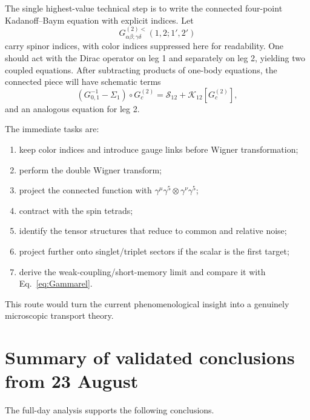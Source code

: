 \documentclass[11pt]{article}
\newcommand{\Scal}{\mathcal S}
\newcommand{\Kcal}{\mathcal K}
\begin{document}
The single highest-value technical step is to write the connected four-point Kadanoff--Baym equation with explicit indices. Let
\begin{equation}
G_{\alpha\beta;\gamma\delta}^{(2)<}(1,2;1',2')
\end{equation}
carry spinor indices, with color indices suppressed here for readability. One should act with the Dirac operator on leg 1 and separately on leg 2, yielding two coupled equations. After subtracting products of one-body equations, the connected piece will have schematic terms
\begin{equation}
\left(G^{-1}_{0,1}-\Sigma_1\right)\circ G_c^{(2)}
=\Scal_{12}+\Kcal_{12}[G_c^{(2)}],
\end{equation}
and an analogous equation for leg 2.

The immediate tasks are:

\begin{enumerate}[leftmargin=1.6em]
\item keep color indices and introduce gauge links before Wigner transformation;
\item perform the double Wigner transform;
\item project the connected function with $\gamma^\mu\gamma^5\otimes\gamma^\nu\gamma^5$;
\item contract with the spin tetrads;
\item identify the tensor structures that reduce to common and relative noise;
\item project further onto singlet/triplet sectors if the scalar is the first target;
\item derive the weak-coupling/short-memory limit and compare it with Eq.~\eqref{eq:Gammarel}.
\end{enumerate}

This route would turn the current phenomenological insight into a genuinely microscopic transport theory.

\section{Summary of validated conclusions from 23 August}

The full-day analysis supports the following conclusions.
\end{document}
